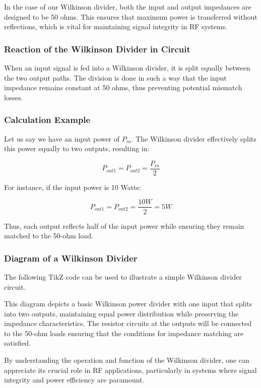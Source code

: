 In the case of our Wilkinson divider, both the input and output impedances are designed to be 50 ohms. This ensures that maximum power is transferred without reflections, which is vital for maintaining signal integrity in RF systems.

\subsubsection{Reaction of the Wilkinson Divider in Circuit}

When an input signal is fed into a Wilkinson divider, it is split equally between the two output paths. The division is done in such a way that the input impedance remains constant at 50 ohms, thus preventing potential mismatch losses. 

\subsubsection{Calculation Example}

Let us say we have an input power of \( P_{in} \). The Wilkinson divider effectively splits this power equally to two outputs, resulting in:

\[
P_{out1} = P_{out2} = \frac{P_{in}}{2}
\]

For instance, if the input power is 10 Watts:

\[
P_{out1} = P_{out2} = \frac{10W}{2} = 5W
\]

Thus, each output reflects half of the input power while ensuring they remain matched to the 50-ohm load.

\subsubsection{Diagram of a Wilkinson Divider}

The following TikZ code can be used to illustrate a simple Wilkinson divider circuit. 

\begin{center}
\end{center}

This diagram depicts a basic Wilkinson power divider with one input that splits into two outputs, maintaining equal power distribution while preserving the impedance characteristics. The resistor circuits at the outputs will be connected to the 50-ohm loads ensuring that the conditions for impedance matching are satisfied.

By understanding the operation and function of the Wilkinson divider, one can appreciate its crucial role in RF applications, particularly in systems where signal integrity and power efficiency are paramount.
